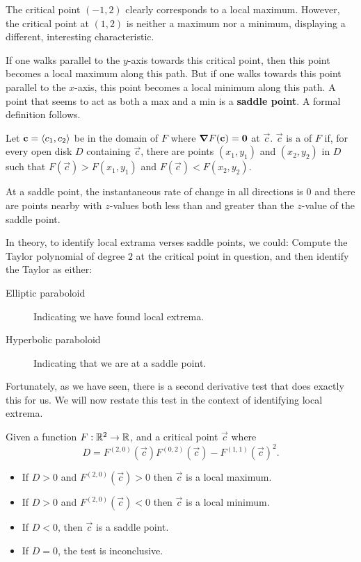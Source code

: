\documentclass{ximera}
\begin{document}
\begin{example}
\begin{explanation}

    The critical point $(-1,2)$ clearly corresponds to a local
    maximum. However, the critical point at $(1,2)$ is neither a
    maximum nor a minimum, displaying a different, interesting
    characteristic.

    If one walks parallel to the $y$-axis towards this critical point,
    then this point becomes a local maximum along this path. But if
    one walks towards this point parallel to the $x$-axis, this point
    becomes a local minimum along this path. A point that seems to act
    as both a max and a min is a \textbf{saddle point}. A formal
    definition follows.
  \end{explanation}
\end{example}


\begin{definition}
  Let $\mathbf{c}=\left\langle c_1,c_2\right\rangle$ be in the domain of $F$ where $\boldsymbol\nabla
  F(\mathbf{c})=\mathbf{0}$ at $\vec{c}$. $\vec{c}$ is a  of $F$ if,
  for every open disk $D$ containing $\vec{c}$, there are points $(x_1,y_1)$
  and $(x_2,y_2)$ in $D$ such that $F(\vec{c})>F(x_1,y_1)$ and
  $F(\vec{c})<F(x_2,y_2)$.  
\end{definition}

At a saddle point, the instantaneous rate of change in all directions
is $0$ and there are points nearby with $z$-values both less than and
greater than the $z$-value of the saddle point.

In theory, to identify local extrama verses saddle points, we could:
Compute the Taylor polynomial of degree $2$ at the critical point in
question, and then identify the Taylor as either:
\begin{description}
\item[Elliptic paraboloid] Indicating we have found local extrema.
\item[Hyperbolic paraboloid] Indicating that we are at a saddle point.
\end{description}
Fortunately, as we have seen, there is a second derivative test that
does exactly this for us. We will now restate this test in the context
of identifying local extrema.

\begin{theorem}
  Given a function $F:\mathbb R^2\to \mathbb R$, and a critical point $\vec{c}$ where
  \[
  D = F^{(2,0)}(\vec{c})F^{(0,2)}(\vec{c})-F^{(1,1)}(\vec{c})^2.
  \]
  \begin{itemize}
  \item If $D>0$ and $F^{(2,0)}(\vec{c})>0$ then $\vec{c}$ is a local maximum.
  \item If $D>0$ and $F^{(2,0)}(\vec{c})<0$ then $\vec{c}$ is a local minimum.
  \item	If $D<0$, then $\vec{c}$ is a saddle point.
  \item If $D=0$, the test is inconclusive.
  \end{itemize}
\end{theorem}
\end{document}
